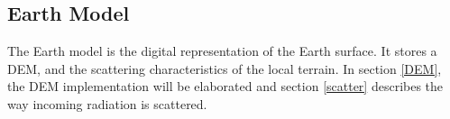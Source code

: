 \subsection{Earth Model}
\label{earthModel}

The Earth model is the digital representation of the Earth surface. It stores a \ac{DEM}, and the
scattering characteristics of the local terrain. In section \ref{DEM}, the \ac{DEM} implementation
will be elaborated and section \ref{scatter} describes the way incoming radiation is scattered.
